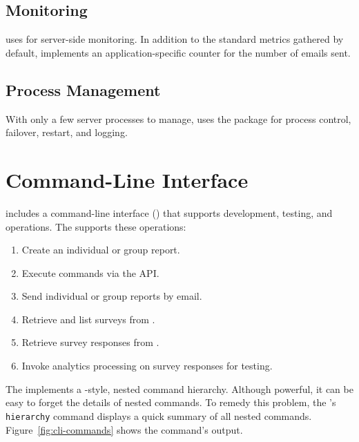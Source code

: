 \documentclass{article}
\begin{document}
\subsection{Monitoring}
\label{sec:monitoring}

\caper{} uses \prometheus{}
for server-side monitoring.
In addition to the standard \linux{} metrics
gathered by default,
\caper{} implements an application-specific
counter for the number of emails sent.


\subsection{Process Management}
\label{sec:process-management}

With only a few server processes to manage,
\caper{} uses the \pmtwo{}
package for process control,
failover,
restart,
and logging.


\section{Command-Line Interface}
\label{sec:cli}

\caper{} includes a command-line interface (\cli)
that supports development, testing, and operations.
The \cli{} supports these operations:
\begin{enumerate}
\item Create an individual or group report.
\item Execute commands via the \qual{} \rest{} API.
\item Send individual or group reports by email.
\item Retrieve and list surveys from \qual.
\item Retrieve survey responses from \qual.
\item Invoke analytics processing on survey responses for testing.
\end{enumerate}

The \cli{} implements a \git-style, nested
command hierarchy.
Although powerful,
it can be easy to forget the details
of nested commands.
To remedy this problem,
the \cli's 
\texttt{hierarchy} command
displays a quick summary of all nested commands.
Figure~\ref{fig:cli-commands}
shows the command's output.
\end{document}
